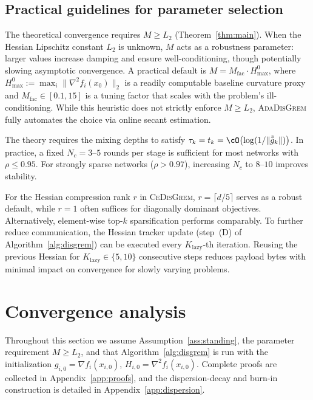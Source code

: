 \documentclass[review,onefignum,onetabnum]{siamart171218}
\begin{document}
	\subsection{Practical guidelines for parameter selection}\label{ssec:practical}
	
	The theoretical convergence requires $M\ge L_2$
	(Theorem~\ref{thm:main}).
	When the Hessian Lipschitz constant $L_2$ is unknown, $M$ acts as a
	robustness parameter: larger values increase damping and ensure
	well-conditioning, though potentially slowing asymptotic convergence.
	A practical default is
	$M = M_{\mathrm{fac}} \cdot H_{\max}^{0}$, where
	$H_{\max}^{0} := \max_i\|\nabla^2 f_i(x_0)\|_2$ is a readily
	computable baseline curvature proxy and
	$M_{\mathrm{fac}} \in [0.1, 15]$ is a tuning factor that scales
	with the problem's ill-conditioning.
	While this heuristic does not strictly enforce $M\ge L_2$,
	\textsc{AdaDisGrem} fully automates the choice via online secant
	estimation.

	The theory requires the mixing depths to satisfy
	$\tau_k = t_k = \cO\bigl(\log(1/\|\tilde{\bar g}_k\|)\bigr)$.
	In practice, a fixed $N_c = 3$--$5$ rounds per stage is sufficient
	for most networks with $\rho \le 0.95$.
	For strongly sparse networks ($\rho > 0.97$), increasing $N_c$ to
	$8$--$10$ improves stability.

	For the Hessian compression rank $r$ in \textsc{CeDisGrem},
	$r = \lceil d/5 \rceil$ serves as a robust default, while $r=1$
	often suffices for diagonally dominant objectives.
	Alternatively, element-wise top-$k$ sparsification performs comparably.
	To further reduce communication, the Hessian tracker update
	(step~(D) of Algorithm~\ref{alg:disgrem}) can be executed every
	$K_{\mathrm{lazy}}$-th iteration.
	Reusing the previous Hessian for
	$K_{\mathrm{lazy}}\in\{5,10\}$ consecutive steps reduces
	payload bytes with minimal impact on convergence for slowly varying
	problems.
	
	
\section{Convergence analysis}\label{sec:theory}
Throughout this section we assume Assumption~\ref{ass:standing},
the parameter requirement $M\ge L_2$, and that
Algorithm~\ref{alg:disgrem} is run with the initialization
$g_{i,0}=\nabla f_i(x_{i,0})$, $H_{i,0}=\nabla^2 f_i(x_{i,0})$.
Complete proofs are collected in Appendix~\ref{app:proofs}, and the
dispersion-decay and burn-in construction is detailed in
Appendix~\ref{app:dispersion}.
\end{document}
